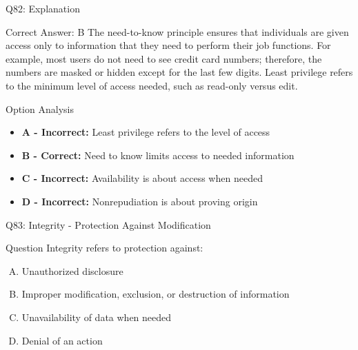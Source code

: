 \documentclass{beamer}
\begin{document}
	\begin{frame}{Q82: Explanation}
		\begin{block}{Correct Answer: B}
			The need-to-know principle ensures that individuals are given access only to information that they need to perform their job functions. For example, most users do not need to see credit card numbers; therefore, the numbers are masked or hidden except for the last few digits. Least privilege refers to the minimum level of access needed, such as read-only versus edit.
		\end{block}
		\begin{block}{Option Analysis}
			\begin{itemize}
				\item \textbf{A - Incorrect:} Least privilege refers to the level of access
				\item \textbf{B - Correct:} Need to know limits access to needed information
				\item \textbf{C - Incorrect:} Availability is about access when needed
				\item \textbf{D - Incorrect:} Nonrepudiation is about proving origin
			\end{itemize}
		\end{block}
	\end{frame}
	
	\begin{frame}{Q83: Integrity - Protection Against Modification}
		\begin{block}{Question}
			Integrity refers to protection against:
		\end{block}
		\begin{enumerate}[(A)]
			\item Unauthorized disclosure
			\item Improper modification, exclusion, or destruction of information
			\item Unavailability of data when needed
			\item Denial of an action
		\end{enumerate}
	\end{frame}
	
\end{document}
